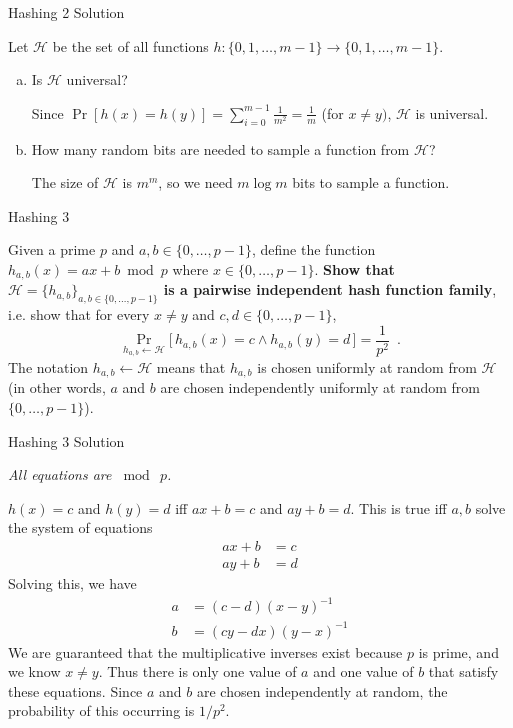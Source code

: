 \documentclass[10pt]{beamer}
\begin{document}
\begin{frame}{Hashing 2 {\color{gray} Solution}}

Let $\mathcal{H}$ be the set of all functions
$h: \{0, 1, \ldots, m - 1\} \to \{0, 1, \ldots, m - 1\}$.

\begin{enumerate}[(a)]
\item Is $\mathcal{H}$ universal?

{\color{blue}
Since $\Pr[h(x) = h(y)] = \sum_{i = 0}^{m - 1} \frac{1}{m^2}
= \frac{1}{m}$ (for $x \neq y)$, $\mathcal{H}$ is universal.}

\item How many random bits are needed to sample a function from $\mathcal{H}$?

{\color{blue}
The size of $\mathcal{H}$ is $m^m$, so we need $m \log m$ bits to sample a function.}
\end{enumerate}

\end{frame}

\begin{frame}{Hashing 3}

Given a prime $p$ and $a, b \in \{0, \dots, p-1\}$, define the function
$h_{a, b}(x) = ax + b \bmod p$ where $x \in \{0, \dots, p - 1\}$.
\textbf{Show that $\mathcal{H} = \{h_{a, b}\}_{a, b \in \{0, \dots, p - 1\}}$
is a pairwise independent hash function family}, i.e. show that for
every $x \neq y$ and $c, d \in \{0, \dots, p - 1\}$,
\[
\Pr_{h_{a, b} \gets \mathcal{H}}\Big[\,h_{a, b}(x) = c \wedge h_{a, b}(y) = d\,\Big] = \frac{1}{p^2}
\enspace.
\]
The notation $h_{a, b} \gets \mathcal{H}$ means that $h_{a, b}$ is chosen uniformly
at random from $\mathcal{H}$ (in other words, $a$ and $b$ are chosen independently
uniformly at random from $\{0, \dots, p-1\}$).

\end{frame}

\begin{frame}{Hashing 3 {\color{gray} Solution}}

{\color{blue}
\textit{All equations are $\bmod~p$.}

$h(x) = c$ and $h(y) = d$ iff $ax + b = c$ and $ay + b = d$.
This is true iff $a, b$ solve the system of equations
\begin{align*}
ax + b &= c \\
ay + b &= d
\end{align*}
Solving this, we have
\begin{align*}
a &= (c - d)(x - y)^{-1} \\
b &= (cy - dx)(y - x)^{-1}
\end{align*}
We are guaranteed that the multiplicative inverses exist because $p$ is prime,
and we know $x \neq y$. Thus there is only one value of $a$ and one value of $b$
that satisfy these equations. Since $a$ and $b$ are chosen independently at random,
the probability of this occurring is $1 / p^2$.
}

\end{frame}
\end{document}
